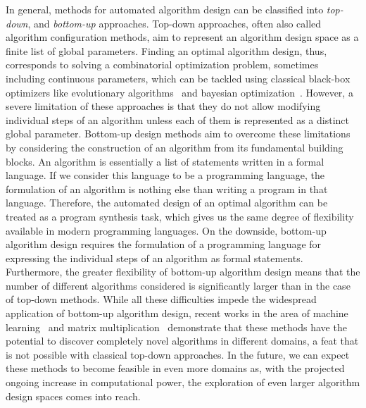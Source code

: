In general, methods for automated algorithm design can be classified into \emph{top-down}, and \emph{bottom-up} approaches.
Top-down approaches, often also called algorithm configuration methods, aim to represent an algorithm design space as a finite list of global parameters.
Finding an optimal algorithm design, thus, corresponds to solving a combinatorial optimization problem, sometimes including continuous parameters, which can be tackled using classical black-box optimizers like evolutionary algorithms~\cite{back1996evolutionary} and bayesian optimization~\cite{frazier2018tutorial}.
However, a severe limitation of these approaches is that they do not allow modifying individual steps of an algorithm unless each of them is represented as a distinct global parameter.
Bottom-up design methods aim to overcome these limitations by considering the construction of an algorithm from its fundamental building blocks.
An algorithm is essentially a list of statements written in a formal language.
If we consider this language to be a programming language, the formulation of an algorithm is nothing else than writing a program in that language.
Therefore, the automated design of an optimal algorithm can be treated as a program synthesis task, which gives us the same degree of flexibility available in modern programming languages.
On the downside, bottom-up algorithm design requires the formulation of a programming language for expressing the individual steps of an algorithm as formal statements.
Furthermore, the greater flexibility of bottom-up algorithm design means that the number of different algorithms considered is significantly larger than in the case of top-down methods.
While all these difficulties impede the widespread application of bottom-up algorithm design, recent works in the area of machine learning~\cite{real2020automl,co2021evolving} and matrix multiplication~\cite{fawzi2022discovering} demonstrate that these methods have the potential to discover completely novel algorithms in different domains, a feat that is not possible with classical top-down approaches.
In the future, we can expect these methods to become feasible in even more domains as, with the projected ongoing increase in computational power, the exploration of even larger algorithm design spaces comes into reach.

